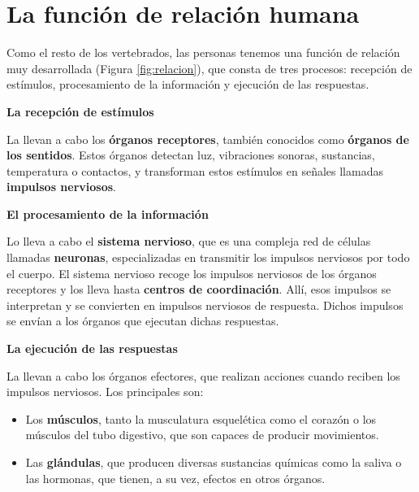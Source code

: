 \section{La función de relación humana}

Como el resto de los vertebrados, las personas tenemos una función de relación muy desarrollada (Figura \ref{fig:relacion}), que consta de tres procesos: recepción de estímulos, procesamiento de la información y ejecución de las respuestas.

\vspace{3mm}
\textbf{La recepción de estímulos}

\vspace{3mm}
La llevan a cabo los \textbf{órganos receptores}, también conocidos como \textbf{órganos de los sentidos}. Estos órganos detectan luz, vibraciones sonoras, sustancias, temperatura o contactos, y transforman estos estímulos en señales llamadas \textbf{impulsos nerviosos}.

\vspace{3mm}
\textbf{El procesamiento de la información}

\vspace{3mm}
Lo lleva a cabo el \textbf{sistema nervioso}, que es una compleja red de células llamadas \textbf{neuronas}, especializadas en transmitir los impulsos nerviosos por todo el cuerpo. El sistema nervioso recoge los impulsos nerviosos de los órganos receptores y los lleva hasta \textbf{centros de coordinación}. Allí, esos impulsos se interpretan y se convierten en impulsos nerviosos de respuesta. Dichos impulsos se envían a los órganos que ejecutan dichas respuestas.

\vspace{3mm}
\textbf{La ejecución de las respuestas}

\vspace{3mm}
La llevan a cabo los órganos efectores, que realizan acciones cuando reciben los impulsos nerviosos. Los principales son:

\begin{itemize}
    \item Los \textbf{músculos}, tanto la musculatura esquelética como el corazón o los músculos del tubo digestivo, que son capaces de producir movimientos.
    \item Las \textbf{glándulas}, que producen diversas sustancias químicas como la saliva o las hormonas, que tienen, a su vez, efectos en otros órganos.
\end{itemize}

